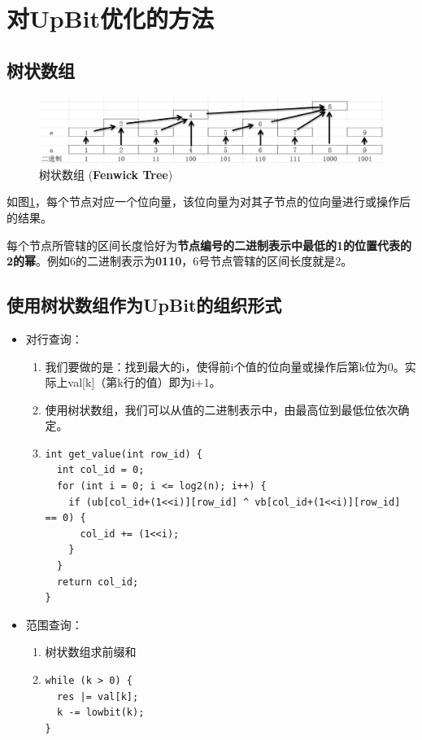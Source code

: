 \documentclass[11pt, a4paper]{article}
\begin{document}
\section{对UpBit优化的方法}
\subsection{树状数组}
\begin{figure}[H]
  \begin{center}
    \includegraphics[width=5.0in]{img/bit.png}
    \caption{树状数组 ({\bf Fenwick Tree})}\label{fig:bit}
  \end{center}
\end{figure}
如图\ref{fig:bit}，每个节点对应一个位向量，该位向量为对其子节点的位向量进行或操作后的结果。

每个节点所管辖的区间长度恰好为{\bf 节点编号的二进制表示中最低的1的位置代表的2的幂}。例如6的二进制表示为{\bf 0110}，6号节点管辖的区间长度就是2。

\subsection{使用树状数组作为UpBit的组织形式}
\begin{itemize}
\item 对行查询：
  \begin{enumerate}[1.]
  \item 我们要做的是：找到最大的i，使得前i个值的位向量或操作后第k位为0。实际上val[k]（第k行的值）即为i+1。
  \item 使用树状数组，我们可以从值的二进制表示中，由最高位到最低位依次确定。
  \item \begin{verbatim}
int get_value(int row_id) {
  int col_id = 0;
  for (int i = 0; i <= log2(n); i++) {
    if (ub[col_id+(1<<i)][row_id] ^ vb[col_id+(1<<i)][row_id] == 0) {
      col_id += (1<<i);
    }
  }
  return col_id;
}
  \end{verbatim}
  \end{enumerate}
\item 范围查询：
  \begin{enumerate}[1.]
  \item 树状数组求前缀和
  \item \begin{verbatim}
while (k > 0) {
  res |= val[k];
  k -= lowbit(k);
}
  \end{verbatim}
  \end{enumerate}
\end{itemize}
\end{document}

